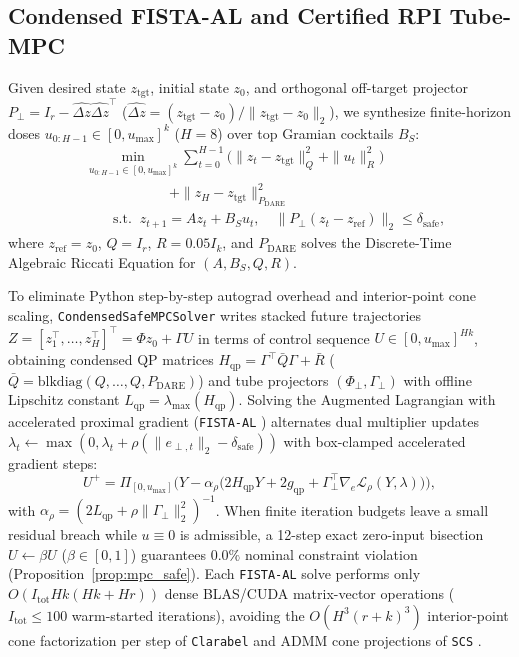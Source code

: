 \documentclass[journal]{IEEEtran}
\begin{document}
\subsection{Condensed FISTA-AL and Certified RPI Tube-MPC}
Given desired state $z_{\mathrm{tgt}}$, initial state $z_0$, and orthogonal off-target projector $P_\perp = I_r - \hat{\Delta z}\hat{\Delta z}^\top$ ($\hat{\Delta z} = (z_{\mathrm{tgt}} - z_0)/\|z_{\mathrm{tgt}} - z_0\|_2$), we synthesize finite-horizon doses $u_{0:H-1} \in [0, u_{\max}]^k$ ($H=8$) over top Gramian cocktails $B_S$:
\begin{align}
  &\min_{u_{0:H-1}\in[0, u_{\max}]^k} \sum_{t=0}^{H-1}\!\big(\|z_t - z_{\mathrm{tgt}}\|_Q^2 + \|u_t\|_R^2\big) \nonumber \\
  &\qquad\qquad\qquad + \|z_H - z_{\mathrm{tgt}}\|_{P_{\mathrm{DARE}}}^2 \nonumber \\
  &\qquad\mathrm{s.t.}\;\; z_{t+1} = A z_t + B_S u_t, \quad \|P_\perp(z_t - z_{\mathrm{ref}})\|_2 \le \delta_{\mathrm{safe}},
  \label{eq:mpc_opt}
\end{align}
where $z_{\mathrm{ref}}=z_0$, $Q = I_r$, $R = 0.05 I_k$, and $P_{\mathrm{DARE}}$ solves the Discrete-Time Algebraic Riccati Equation for $(A, B_S, Q, R)$.

To eliminate Python step-by-step autograd overhead and interior-point cone scaling, \texttt{CondensedSafeMPCSolver} writes stacked future trajectories $Z = [z_1^\top,\dots,z_H^\top]^\top = \Phi z_0 + \Gamma U$ in terms of control sequence $U \in [0, u_{\max}]^{Hk}$, obtaining condensed QP matrices $H_{\mathrm{qp}}=\Gamma^\top\bar{Q}\Gamma+\bar{R}$ ($\bar{Q}=\mathrm{blkdiag}(Q,\dots,Q,P_{\mathrm{DARE}})$) and tube projectors $(\Phi_\perp,\Gamma_\perp)$ with offline Lipschitz constant $L_{\mathrm{qp}}=\lambda_{\max}(H_{\mathrm{qp}})$. Solving the Augmented Lagrangian with accelerated proximal gradient (\texttt{FISTA-AL} \cite{beck2009fista}) alternates dual multiplier updates $\lambda_t \leftarrow \max(0, \lambda_t + \rho(\|e_{\perp,t}\|_2 - \delta_{\mathrm{safe}}))$ with box-clamped accelerated gradient steps:
\begin{equation}
  U^{+} = \Pi_{[0, u_{\max}]}\!\Big(Y - \alpha_{\rho}\big(2 H_{\mathrm{qp}} Y + 2 g_{\mathrm{qp}} + \Gamma_\perp^\top \nabla_e \mathcal{L}_\rho(Y,\lambda)\big)\Big),
  \label{eq:fista_step}
\end{equation}
with $\alpha_\rho = (2 L_{\mathrm{qp}} + \rho\|\Gamma_\perp\|_2^2)^{-1}$. When finite iteration budgets leave a small residual breach while $u\equiv 0$ is admissible, a 12-step exact zero-input bisection $U \leftarrow \beta U$ ($\beta \in [0,1]$) guarantees $0.0\%$ nominal constraint violation (Proposition~\ref{prop:mpc_safe}). Each \texttt{FISTA-AL} solve performs only $O(I_{\mathrm{tot}} H k(Hk + Hr))$ dense BLAS/CUDA matrix-vector operations ($I_{\mathrm{tot}}\le 100$ warm-started iterations), avoiding the $O(H^3(r+k)^3)$ interior-point cone factorization per step of \texttt{Clarabel} \cite{goulart2024clarabel} and ADMM cone projections of \texttt{SCS} \cite{odonoghue2016conic}.
\end{document}
